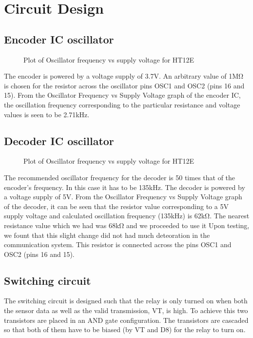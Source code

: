 \newpage
\chapter{Circuit Design}
\section{Encoder IC oscillator}
\begin{figure}[ht]
  \centering
  \caption{Plot of Oscillator frequency vs supply voltage for HT12E}
\end{figure}

\vspace*{.5cm}
The encoder is powered by a voltage supply of 3.7V. An arbitrary
value of 1MΩ is chosen for the resistor across the oscillator pins
OSC1 and OSC2 (pins 16 and 15). From the Oscillator Frequency vs
Supply Voltage graph of the encoder IC, the oscillation frequency
corresponding to the particular resistance and voltage values is seen
to be 2.71kHz.

\newpage

\section{Decoder IC oscillator}
\begin{figure}[ht]
  \centering
  \caption{Plot of Oscillator frequency vs supply voltage for HT12E}
\end{figure}

\vspace*{.5cm}
The recommended oscillator frequency for the decoder is 50 times that
of the encoder's frequency. In this case it has to be 135kHz. The
decoder is powered by a voltage supply of 5V. From the Oscillator
Frequency vs Supply Voltage graph of the decoder, it can be seen that
the resistor value corresponding to a 5V supply voltage and
calculated oscillation frequency (135kHz) is 62kΩ. The nearest
resistance value which we had was 68kΩ and we proceeded to use it
Upon testing, we fount that this slight change did not had much deteoration
in the communication system. This resistor is connected across the pins OSC1 and OSC2 (pins 16 and 15).

\section{Switching circuit}
The switching circuit is designed such that the relay is only turned
on when both the sensor data as well as the valid transmission, VT,
is high. To achieve this two transistors are placed in an AND gate
configuration. The transistors are cascaded so that both of them have
to be biased (by VT and D8) for the relay to turn on.

